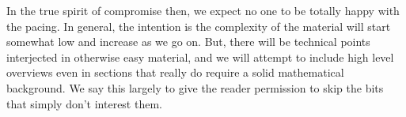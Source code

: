 \documentclass[12pt,oneside]{../../sfsuthesis}
\begin{document}
In the true spirit of compromise then, we expect no one to be totally happy with the pacing.
In general, the intention is the complexity of the material will start somewhat low and increase as we go on.
But, there will be technical points interjected in otherwise easy material, and we will attempt to include high level overviews even in sections that really do require a solid mathematical background.
We say this largely to give the reader permission to skip the bits that simply don't interest them.
\end{document}

